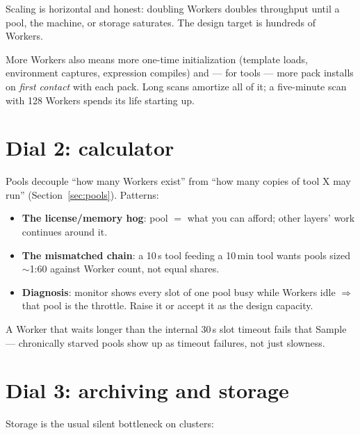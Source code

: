 Scaling is horizontal and honest: doubling Workers doubles throughput until a pool,
the machine, or storage saturates. The design target is hundreds of Workers.

\begin{jnote}
More Workers also means more one-time initialization (template loads, environment
captures, expression compiles) and --- for  tools --- more pack
installs on \emph{first contact} with each pack. Long scans amortize all of it; a
five-minute scan with 128 Workers spends its life starting up.
\end{jnote}

\section{Dial 2: calculator }
\label{sec:perf-pools}

Pools decouple ``how many Workers exist'' from ``how many copies of tool X may run''
(Section~\ref{sec:pools}). Patterns:

\begin{itemize}
  \item \textbf{The license/memory hog}: pool $=$ what you can afford; other layers'
        work continues around it.
  \item \textbf{The mismatched chain}: a 10\,s tool feeding a 10\,min tool wants pools
        sized $\sim$1:60 against Worker count, not equal shares.
  \item \textbf{Diagnosis}: monitor shows every slot of one pool busy while Workers
        idle $\Rightarrow$ that pool is the throttle. Raise it or accept it as the
        design capacity.
\end{itemize}

A Worker that waits longer than the internal 30\,s slot timeout fails that Sample ---
chronically starved pools show up as timeout failures, not just slowness.

\section{Dial 3: archiving and storage}
\label{sec:perf-storage}

Storage is the usual silent bottleneck on clusters:

